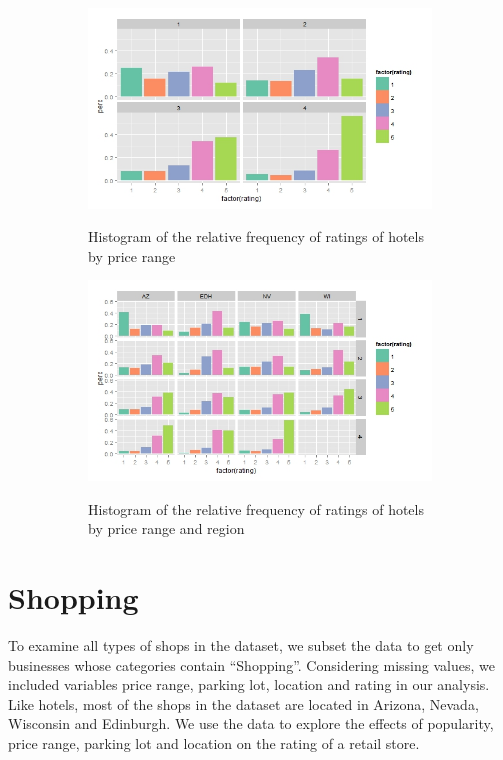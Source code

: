 \documentclass[11pt]{article}
\begin{document}
\begin{figure}
\centering
\begin{subfigure}{.5\textwidth}
	\centering
           \caption{Histogram of the relative frequency of ratings of hotels by price range}
	\includegraphics[width=1\textwidth]{Figures/hotels1.jpeg}
           \label{hotels1}
\end{subfigure}
\begin{subfigure}{.5\textwidth}
	\centering
           \caption{Histogram of the relative frequency of ratings of hotels by price range and region}
	\includegraphics[width=1\textwidth]{Figures/hotels2.jpeg}
           \label{hotels2}
\end{subfigure}
\caption{}
\label{}
\end{figure}

\section{Shopping}

To examine all types of shops in the dataset, we subset the data to get only businesses whose categories contain “Shopping”. Considering missing values, we included variables price range, parking lot, location and rating in our analysis. Like hotels, most of the shops in the dataset are located in Arizona, Nevada, Wisconsin and Edinburgh. We use the data to explore the effects of popularity, price range, parking lot and location on the rating of a retail store.
\end{document}
